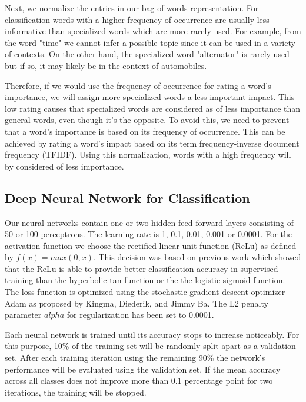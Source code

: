 \documentclass[sigconf]{acmart}
\begin{document}
Next, we normalize the entries in our bag-of-words representation. For classification words with a higher frequency of occurrence are usually less informative than specialized words which are more rarely used. For example, from the word "time" we cannot infer a possible topic since it can be used in a variety of contexts. On the other hand, the specialized word "alternator" is rarely used but if so, it may likely be in the context of automobiles.

Therefore, if we would use the frequency of occurrence for rating a word's importance, we will assign more specialized words a less important impact. This low rating causes that specialized words are considered as of less importance than general words, even though it's the opposite. To avoid this, we need to prevent that a word's importance is based on its frequency of occurrence. This can be achieved by rating a word's impact based on its term frequency-inverse document frequency (TFIDF). Using this normalization, words with a high frequency will by considered of less importance.

\subsection{Deep Neural Network for Classification}
\label{deep-neural-network}

Our neural networks contain one or two hidden feed-forward layers consisting of 50 or 100 perceptrons. The learning rate is 1, 0.1, 0.01, 0.001 or 0.0001. For the activation function we choose the rectified linear unit function (ReLu) as defined by $f(x) = max(0, x)$. This decision was based on previous work which showed that the ReLu is able to provide better classification accuracy in supervised training than the hyperbolic tan function or the the logistic sigmoid function\cite{pmlr-v15-glorot11a}. The loss-function is optimized using the stochastic gradient descent optimizer Adam as proposed by Kingma, Diederik, and Jimmy Ba\cite{adam}. The L2 penalty parameter $alpha$ for regularization has been set to 0.0001.

Each neural network is trained until its accuracy stops to increase noticeably. For this purpose, 10\% of the training set will be randomly split apart as a validation set. After each training iteration using the remaining 90\% the network's performance will be evaluated using the validation set. If the mean accuracy across all classes does not improve more than 0.1 percentage point for two iterations, the training will be stopped. 
\end{document}
